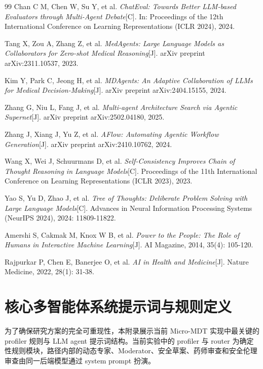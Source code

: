 \documentclass[11pt,a4paper]{ctexart}
\begin{document}
\begin{thebibliography}{99}
Chan C M, Chen W, Su Y, et al.
\emph{ChatEval: Towards Better LLM-based Evaluators through Multi-Agent Debate}[C].
In: Proceedings of the 12th International Conference on Learning Representations (ICLR 2024), 2024.

Tang X, Zou A, Zhang Z, et al.
\emph{MedAgents: Large Language Models as Collaborators for Zero-shot Medical Reasoning}[J].
arXiv preprint arXiv:2311.10537, 2023.

Kim Y, Park C, Jeong H, et al.
\emph{MDAgents: An Adaptive Collaboration of LLMs for Medical Decision-Making}[J].
arXiv preprint arXiv:2404.15155, 2024.

Zhang G, Niu L, Fang J, et al.
\emph{Multi-agent Architecture Search via Agentic Supernet}[J].
arXiv preprint arXiv:2502.04180, 2025.

Zhang J, Xiang J, Yu Z, et al.
\emph{AFlow: Automating Agentic Workflow Generation}[J].
arXiv preprint arXiv:2410.10762, 2024.

Wang X, Wei J, Schuurmans D, et al.
\emph{Self-Consistency Improves Chain of Thought Reasoning in Language Models}[C].
Proceedings of the 11th International Conference on Learning Representations (ICLR 2023), 2023.

Yao S, Yu D, Zhao J, et al.
\emph{Tree of Thoughts: Deliberate Problem Solving with Large Language Models}[C].
Advances in Neural Information Processing Systems (NeurIPS 2024), 2024: 11809-11822.

Amershi S, Cakmak M, Knox W B, et al.
\emph{Power to the People: The Role of Humans in Interactive Machine Learning}[J].
AI Magazine, 2014, 35(4): 105-120.

Rajpurkar P, Chen E, Banerjee O, et al.
\emph{AI in Health and Medicine}[J].
Nature Medicine, 2022, 28(1): 31-38.

\end{thebibliography}

\newpage
\appendix
\renewcommand\thesection{附录 \Alph{section}}

\section{核心多智能体系统提示词与规则定义}
为了确保研究方案的完全可重现性，本附录展示当前 Micro-MDT 实现中最关键的 profiler 规则与 LLM agent 提示词结构。当前实验中的 profiler 与 router 为确定性规则模块，路径内部的动态专家、Moderator、安全草案、药师审查和安全伦理审查由同一后端模型通过 system prompt 扮演。
\end{document}
